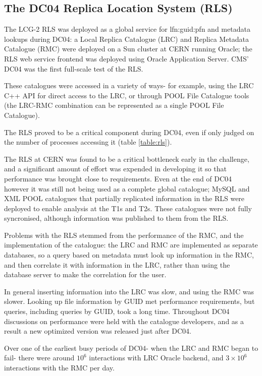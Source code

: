 \documentclass{cmspaper}
\begin{document}
\subsection{The DC04 Replica Location System (RLS)}
The LCG-2 RLS was deployed as a global service for lfn:guid:pfn and
metadata lookups during DC04: a Local Replica Catalogue (LRC) and
Replica Metadata Catalogue (RMC) were deployed on a Sun cluster at
CERN running Oracle; the RLS web service frontend was deployed using
Oracle Application Server. CMS' DC04 was the first full-scale test of
the RLS.

These catalogues were accessed in a variety of ways- for example,
using the LRC C++ API for direct access to the LRC, or through POOL
File Catalogue tools (the LRC-RMC combination can be represented as a
single POOL File Catalogue).

The RLS proved to be a critical component during DC04, even if only
judged on the number of processes accessing it (table
\ref{table:rls}).

The RLS at CERN was found to be a critical bottleneck early in the
challenge, and a significant amount of effort was expended in
developing it so that performance was brought close to
requirements. Even at the end of DC04 however it was still not being
used as a complete global catalogue; MySQL and XML POOL catalogues that
partially replicated information in the RLS were deployed to enable
analysis at the T1s and T2s. These catalogues were not fully
syncronised, although information was published to them from the RLS.

Problems with the RLS stemmed from the performance of the RMC, and the
implementation of the catalogue: the LRC and RMC are implemented as
separate databases, so a query based on metadata must look up
information in the RMC, and then correlate it with information in the
LRC, rather than using the database server to make the correlation for
the user.

In general inserting information into the LRC was slow, and using the
RMC was slower. Looking up file information by GUID met performance
requirements, but queries, including queries by GUID, took a long
time. Throughout DC04 discussions on performance were held with the
catalogue developers, and as a result a new optimized version was
released just after DC04.

Over one of the earliest busy periods of DC04- when the LRC and RMC
began to fail- there were around $10^6$ interactions with LRC Oracle
backend, and $3\times10^6$ interactions with the RMC per day.
\end{document}
